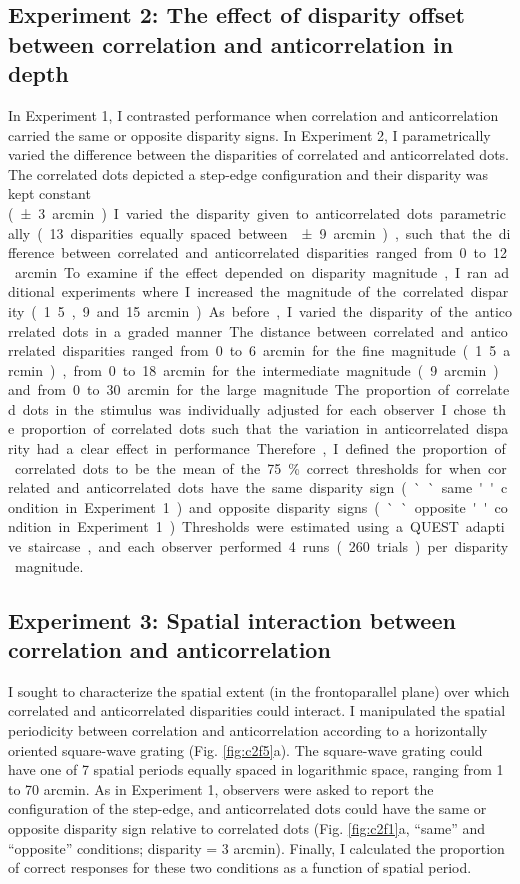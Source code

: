 \subsection{Experiment 2: The effect of disparity offset between correlation and anticorrelation in depth}
In Experiment 1, I contrasted performance when correlation and anticorrelation carried the same or opposite disparity signs. In Experiment 2, I parametrically varied the difference between the disparities of correlated and anticorrelated dots. The correlated dots depicted a step-edge configuration and their disparity was kept constant (\SI{\pm 3} arcmin). I varied the disparity given to anticorrelated dots parametrically (13 disparities equally spaced between \SI{\pm 9} arcmin), such that the difference between correlated and anticorrelated disparities ranged from 0 to 12 arcmin.

To examine if the effect depended on disparity magnitude, I ran additional experiments where I increased the magnitude of the correlated disparity (1.5, 9 and 15 arcmin). As before, I varied the disparity of the anticorrelated dots in a graded manner. The distance between correlated and anticorrelated disparities ranged from 0 to 6 arcmin for the fine magnitude (1.5 arcmin), from 0 to 18 arcmin for the intermediate magnitude (9 arcmin) and from 0 to 30 arcmin for the large magnitude.

The proportion of correlated dots in the stimulus was individually adjusted for each observer. I chose the proportion of correlated dots such that the variation in anticorrelated disparity had a clear effect in performance. Therefore, I defined the proportion of correlated dots to be the mean of the 75\% correct thresholds for when correlated and anticorrelated dots have the same disparity sign (``same'' condition in Experiment 1) and opposite disparity signs (``opposite'' condition in Experiment 1).
Thresholds were estimated using a QUEST adaptive staircase, and each observer performed 4 runs (260 trials) per disparity magnitude.

\subsection{Experiment 3: Spatial interaction between correlation and anticorrelation}
I sought to characterize the spatial extent (in the frontoparallel plane) over which correlated and anticorrelated disparities could interact. I manipulated the spatial periodicity between correlation and anticorrelation according to a horizontally oriented square-wave grating (Fig. \ref{fig:c2f5}a). The square-wave grating could have one of 7 spatial periods equally spaced in logarithmic space, ranging from 1 to 70 arcmin.
As in Experiment 1, observers were asked to report the configuration of the step-edge, and anticorrelated dots could have the same or opposite disparity sign relative to correlated dots (Fig. \ref{fig:c2f1}a, ``same'' and ``opposite'' conditions; disparity =  3 arcmin). Finally, I calculated the proportion of correct responses for these two conditions as a function of spatial period.

